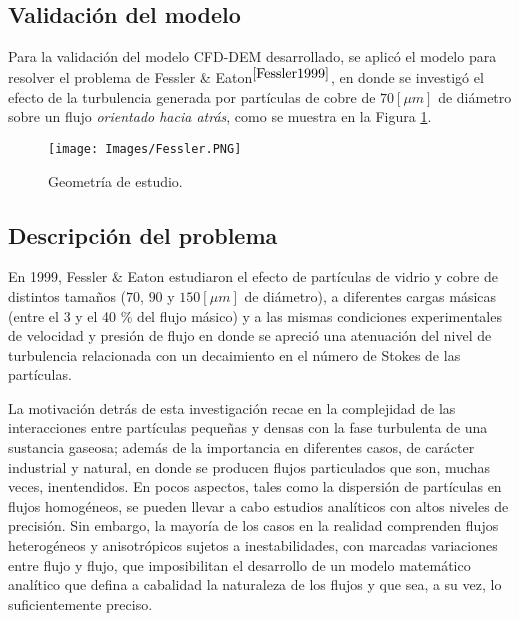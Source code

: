 \begin{center}
    \section{Validaci\'on del modelo}
\end{center}

\noindent
\justify

Para la validaci\'on del modelo CFD-DEM desarrollado, se aplic\'o el modelo para resolver el problema de Fessler \& Eaton$^{\cite{Fessler1999}}$, en donde se investig\'o el efecto de la turbulencia generada por part\'iculas de cobre de $70 [\mu m]$ de di\'ametro sobre un flujo \textit{orientado hacia atr\'as}, como se muestra en la Figura \ref{problemaVal}.

\begin{figure}[h!]
    \centering
    \texttt{[image: Images/Fessler.PNG]}
    \caption{Geometr\'ia de estudio.}
    \label{problemaVal}
\end{figure}

\subsection{Descripci\'on del problema}

\noindent
\justify

En 1999, Fessler \& Eaton estudiaron el efecto de part\'iculas de vidrio y cobre de distintos tama\~nos ($70$, $90$ y $150 [\mu m]$ de di\'ametro), a diferentes cargas m\'asicas (entre el 3 y el 40 \% del flujo m\'asico) y a las mismas condiciones experimentales de velocidad y presi\'on de flujo en donde se apreci\'o una atenuaci\'on del nivel de turbulencia relacionada con un decaimiento en el n\'umero de Stokes de las part\'iculas.

\noindent
\justify

La motivaci\'on detr\'as de esta investigaci\'on recae en la complejidad de las interacciones entre part\'iculas peque\~nas y densas con la fase turbulenta de una sustancia gaseosa; adem\'as de la importancia en diferentes casos, de car\'acter industrial y natural, en donde se producen flujos particulados que son, muchas veces, inentendidos. En pocos aspectos, tales como la dispersi\'on de part\'iculas en flujos homog\'eneos, se pueden llevar a cabo estudios anal\'iticos con altos niveles de precisi\'on. Sin embargo, la mayor\'ia de los casos en la realidad comprenden flujos heterog\'eneos y anisotr\'opicos sujetos a inestabilidades, con marcadas variaciones entre flujo y flujo, que imposibilitan el desarrollo de un modelo matem\'atico anal\'itico que defina a cabalidad la naturaleza de los flujos y que sea, a su vez, lo suficientemente preciso. 

